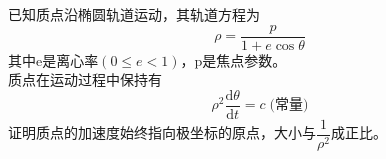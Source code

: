 \documentclass{article}        %
\begin{document}

已知质点沿椭圆轨道运动，其轨道方程为$$\rho = \dfrac{p}{1+e\cos \theta} $$
其中e是离心率$(0\leqslant e < 1)$，p是焦点参数。\\
质点在运动过程中保持有$$\rho^2 \dfrac{\mathrm{d}\theta}{\mathrm{d}t} = c \;\text{(常量)}$$
证明质点的加速度始终指向极坐标的原点，大小与$\dfrac{1}{\rho^2}$成正比。
\end{document}
